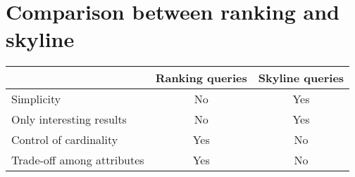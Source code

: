 \section{Comparison between ranking and skyline}

\begin{table}[H]
    \centering
    \begin{tabular}{l|cc|}
    \cline{2-3}
                                                        & \textbf{Ranking queries} & \textbf{Skyline queries} \\ \hline
    \multicolumn{1}{|l|}{Simplicity}                 & No              & Yes             \\
    \multicolumn{1}{|l|}{Only interesting results}   & No              & Yes             \\
    \multicolumn{1}{|l|}{Control of cardinality}     & Yes             & No              \\
    \multicolumn{1}{|l|}{Trade-off among attributes} & Yes             & No              \\ \hline
    \end{tabular}
\end{table}